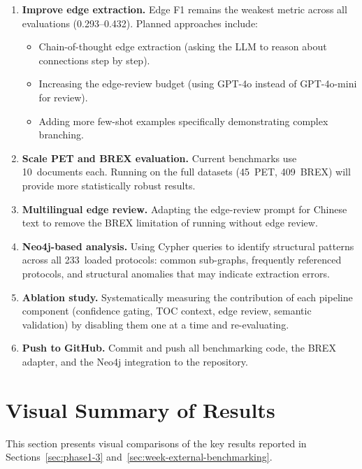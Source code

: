 \documentclass[12pt,a4paper]{article}
\begin{document}
\begin{enumerate}[leftmargin=2em]
    \item \textbf{Improve edge extraction.} Edge F1 remains the weakest metric across all evaluations (0.293--0.432). Planned approaches include:
    \begin{itemize}
        \item Chain-of-thought edge extraction (asking the LLM to reason about connections step by step).
        \item Increasing the edge-review budget (using GPT-4o instead of GPT-4o-mini for review).
        \item Adding more few-shot examples specifically demonstrating complex branching.
    \end{itemize}

    \item \textbf{Scale PET and BREX evaluation.} Current benchmarks use 10~documents each. Running on the full datasets (45~PET, 409~BREX) will provide more statistically robust results.

    \item \textbf{Multilingual edge review.} Adapting the edge-review prompt for Chinese text to remove the BREX limitation of running without edge review.

    \item \textbf{Neo4j-based analysis.} Using Cypher queries to identify structural patterns across all 233~loaded protocols: common sub-graphs, frequently referenced protocols, and structural anomalies that may indicate extraction errors.

    \item \textbf{Ablation study.} Systematically measuring the contribution of each pipeline component (confidence gating, TOC context, edge review, semantic validation) by disabling them one at a time and re-evaluating.

    \item \textbf{Push to GitHub.} Commit and push all benchmarking code, the BREX adapter, and the Neo4j integration to the repository.
\end{enumerate}

\section{Visual Summary of Results}
\label{sec:visual-summary}

This section presents visual comparisons of the key results reported in Sections~\ref{sec:phase1-3} and~\ref{sec:week-external-benchmarking}.
\end{document}
